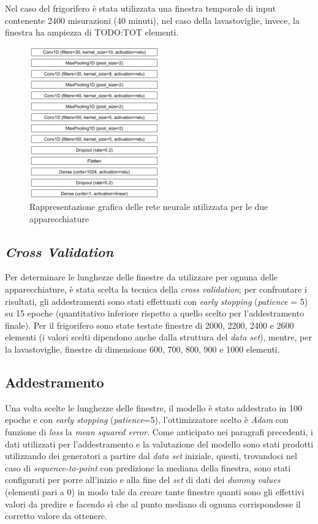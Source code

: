\documentclass[12pt,a4paper,fleqn]{article}
\begin{document}
Nel caso del frigorifero è stata utilizzata una finestra temporale di input contenente 2400 misurazioni (40 minuti), nel caso della lavastoviglie, invece, la finestra ha ampiezza di TODO:TOT elementi.


\begin{figure}
\centering
\includegraphics[width=0.5\textwidth]{images/model.png}
\caption{Rappresentazione grafica delle rete neurale utilizzata per le due apparecchiature}
\label{fig:modello}
\end{figure}

\subsection{\textsl{Cross Validation}}
Per determinare le lunghezze delle finestre da utilizzare per ognuna delle apparecchiature, è stata scelta la tecnica della \textsl{cross validation}; per confrontare i risultati, gli addestramenti sono stati effettuati con \textsl{early stopping} (\textsl{patience} = 5) su 15 epoche (quantitativo inferiore rispetto a quello scelto per l'addestramento finale). Per il frigorifero sono state testate finestre di 2000, 2200, 2400 e 2600 elementi (i valori scelti dipendono anche dalla struttura del \textsl{data set}), mentre, per la lavastoviglie, finestre di dimensione 600, 700, 800, 900 e 1000 elementi.

\subsection{Addestramento}
Una volta scelte le lunghezze delle finestre, il modello è stato addestrato in 100 epoche e con \textsl{early stopping} (\textsl{patience}=5), l'ottimizzatore scelto è \textsl{Adam} con funzione di \textsl{loss} la \textsl{mean squared error}. Come anticipato nei paragrafi precedenti, i dati utilizzati per l'addestramento e la valutazione del modello sono stati prodotti utilizzando dei generatori a partire dal \textsl{data set} iniziale, questi, trovandoci nel caso di \textsl{sequence-to-point} con predizione la mediana della finestra, sono stati configurati per porre all'inizio e alla fine del \textsl{set} di dati dei \textsl{dummy values} (elementi pari a 0) in modo tale da creare tante finestre quanti sono gli effettivi valori da predire e facendo sì che al punto mediano di ognuna corrispondesse il corretto valore da ottenere.
\end{document}

